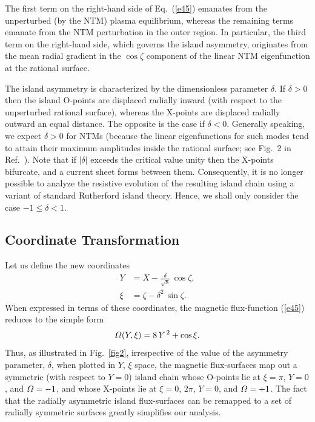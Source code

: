 \documentclass[12pt,prb,aps]{revtex4-1}
\begin{document}
The first term on the right-hand side of Eq.~(\ref{e45}) emanates from the unperturbed (by the NTM) plasma equilibrium, whereas the
remaining terms emanate from the NTM perturbation in the outer region. In particular, the third term on the right-hand
side, which governs the island asymmetry,  originates from  the mean radial gradient in the $\cos\zeta$ component of the linear NTM eigenfunction at the rational surface. 

The island asymmetry is characterized by the dimensionless parameter $\delta$. If $\delta >0$ then the island O-points are displaced radially inward (with respect to the unperturbed rational
surface), whereas the X-points are displaced radially outward an equal distance. The opposite is the case if $\delta <0$. Generally speaking,  we
expect $\delta>0$ for NTMs (because the linear eigenfunctions for such modes tend to attain their
maximum amplitudes inside the rational surface; see Fig.~2 in Ref.~). Note that if  $|\delta|$ exceeds the critical value
unity then the X-points bifurcate, and a current sheet forms between them.\cite{wal}  Consequently,  it is no longer possible to analyze the resistive evolution of the  resulting island chain  using a variant of standard Rutherford island theory.\cite{ntm1} Hence, we shall only consider the case $-1\leq \delta < 1$. 

\subsection{Coordinate Transformation}
Let us define the new coordinates\,\cite{island}
\begin{align}
Y &= X-\frac{\delta}{\sqrt{8}}\,\cos\zeta,\label{ek}\\[0.5ex]
\xi&=\zeta-\delta^2\,\sin\zeta.\label{ekepler}
\end{align}
When expressed in terms of these coordinates, the magnetic flux-function (\ref{e45}) reduces to the simple
form
\begin{equation}\label{eeven}
{\mit\Omega}(Y,\xi) =8\,Y^{\,2}+\cos\xi.
\end{equation}
Thus, as illustrated in Fig.~\ref{fig2}, irrespective of the value of the asymmetry parameter, $\delta$, when
plotted in $Y$, $\xi$ space, the magnetic flux-surfaces map out a symmetric (with respect to $Y=0$) island
chain whose O-points lie at $\xi=\pi$, $Y=0$,
and ${\mit\Omega}=-1$, and whose X-points lie at $\xi=0$, $2\pi$, $Y=0$, and ${\mit\Omega}=+1$.  The fact that the radially asymmetric island flux-surfaces can
be remapped to a set of radially symmetric surfaces greatly simplifies our analysis. 
\end{document}
